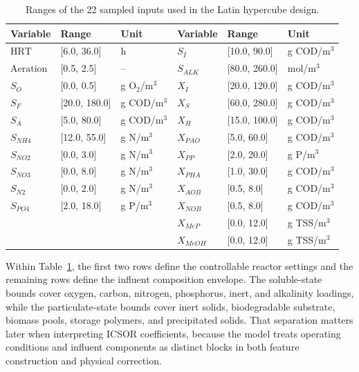 \documentclass[a4paper,fleqn]{cas-sc}
\newenvironment{revblock}{}{}
\newenvironment{revblockr116}{}{}
\begin{document}
\begin{revblock}
\begin{table}[htbp]
\centering
\caption{Ranges of the 22 sampled inputs used in the Latin hypercube design.}
\label{tab:simulation_domain}
\scriptsize
\setlength{\tabcolsep}{4pt}
\begin{tabular}{lll|lll}
\hline
Variable & Range & Unit & Variable & Range & Unit \\
\hline
$\mathrm{HRT}$ & [6.0, 36.0] & h & $S_I$ & [10.0, 90.0] & g COD/m$^3$ \\
$\mathrm{Aeration}$ & [0.5, 2.5] & -- & $S_{ALK}$ & [80.0, 260.0] & mol/m$^3$ \\
$S_O$ & [0.0, 0.5] & g O$_2$/m$^3$ & $X_I$ & [20.0, 120.0] & g COD/m$^3$ \\
$S_F$ & [20.0, 180.0] & g COD/m$^3$ & $X_S$ & [60.0, 280.0] & g COD/m$^3$ \\
$S_A$ & [5.0, 80.0] & g COD/m$^3$ & $X_H$ & [15.0, 100.0] & g COD/m$^3$ \\
$S_{NH4}$ & [12.0, 55.0] & g N/m$^3$ & $X_{PAO}$ & [5.0, 60.0] & g COD/m$^3$ \\
$S_{NO2}$ & [0.0, 3.0] & g N/m$^3$ & $X_{PP}$ & [2.0, 20.0] & g P/m$^3$ \\
$S_{NO3}$ & [0.0, 8.0] & g N/m$^3$ & $X_{PHA}$ & [1.0, 30.0] & g COD/m$^3$ \\
$S_{N2}$ & [0.0, 2.0] & g N/m$^3$ & $X_{AOB}$ & [0.5, 8.0] & g COD/m$^3$ \\
$S_{PO4}$ & [2.0, 18.0] & g P/m$^3$ & $X_{NOB}$ & [0.5, 8.0] & g COD/m$^3$ \\
 &  &  & $X_{MeP}$ & [0.0, 12.0] & g TSS/m$^3$ \\
 &  &  & $X_{MeOH}$ & [0.0, 12.0] & g TSS/m$^3$ \\
\hline
\end{tabular}
\end{table}

Within Table~\ref{tab:simulation_domain}, the first two rows define the controllable reactor settings and the remaining rows define the influent composition envelope. The soluble-state bounds cover oxygen, carbon, nitrogen, phosphorus, inert, and alkalinity loadings, while the particulate-state bounds cover inert solids, biodegradable substrate, biomass pools, storage polymers, and precipitated solids. That separation matters later when interpreting ICSOR coefficients, because the model treats operating conditions and influent components as distinct blocks in both feature construction and physical correction.

\begin{revblockr116}

\end{revblockr116}
\end{revblock}
\end{document}
